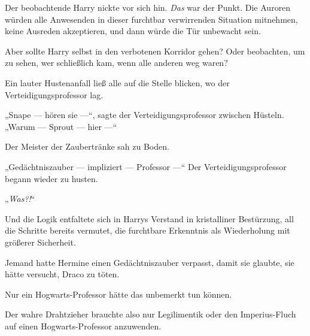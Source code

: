 Der beobachtende Harry nickte vor sich hin. \emph{Das} war der Punkt. Die Auroren würden alle Anwesenden in dieser furchtbar verwirrenden Situation mitnehmen, keine Ausreden akzeptieren, und dann würde die Tür unbewacht sein.

Aber sollte Harry selbst in den verbotenen Korridor gehen? Oder beobachten, um zu sehen, wer schließlich kam, wenn alle anderen weg waren?

Ein lauter Hustenanfall ließ alle auf die Stelle blicken, wo der Verteidigungsprofessor lag.

„Snape — hören sie —“, sagte der Verteidigungsprofessor zwischen Hüsteln.
„Warum — Sprout — hier —“

Der Meister der Zaubertränke sah zu Boden.

„Gedächtniszauber — impliziert — Professor —“
Der Verteidigungsprofessor begann wieder zu husten.

„\emph{Was?!}“

Und die Logik entfaltete sich in Harrys Verstand in kristalliner Bestürzung, all die Schritte bereits vermutet, die furchtbare Erkenntnis als Wiederholung mit größerer Sicherheit.

Jemand hatte Hermine einen Gedächtniszauber verpasst, damit sie glaubte, sie hätte versucht, Draco zu töten.

Nur ein Hogwarts-Professor hätte das unbemerkt tun können.

Der wahre Drahtzieher brauchte also nur Legilimentik oder den Imperius-Fluch auf einen Hogwarts-Professor anzuwenden.

